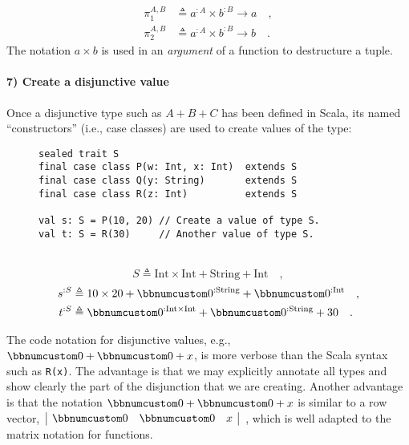 ~\vspace{-1\baselineskip}
\begin{align*}
\pi_{1}^{A,B} & \triangleq a^{:A}\times b^{:B}\rightarrow a\quad,\\
\pi_{2}^{A,B} & \triangleq a^{:A}\times b^{:B}\rightarrow b\quad.
\end{align*}
The notation $a\times b$ is used in an \emph{argument} of a function
to destructure a tuple.

\paragraph{7) Create a disjunctive value}

Once a disjunctive type such as $A+B+C$ has been defined in Scala,
its named \textsf{``}constructors\textsf{''} (i.e., case classes) are used to create
values of the type:

\begin{wrapfigure}{l}{0.5\columnwidth}%
\vspace{-0.75\baselineskip}
\begin{lstlisting}
sealed trait S
final case class P(w: Int, x: Int)  extends S
final case class Q(y: String)       extends S
final case class R(z: Int)          extends S

val s: S = P(10, 20) // Create a value of type S.
val t: S = R(30)     // Another value of type S.
\end{lstlisting}

\vspace{-0\baselineskip}
\end{wrapfigure}%

~\vspace{0.35\baselineskip}
\[
S\triangleq\text{Int}\times\text{Int}+\text{String}+\text{Int}\quad,
\]
\begin{align*}
s^{:S} & \triangleq10\times20+\bbnum 0^{:\text{String}}+\bbnum 0^{:\text{Int}}\quad,\\
t^{:S} & \triangleq\bbnum 0^{:\text{Int}\times\text{Int}}+\bbnum 0^{:\text{String}}+30\quad.
\end{align*}
\vspace{-0.9\baselineskip}

The code notation for disjunctive values, e.g., $\bbnum 0+\bbnum 0+x$,
is more verbose than the Scala syntax such as \lstinline!R(x)!. The
advantage is that we may explicitly annotate all types and show clearly
the part of the disjunction that we are creating. Another advantage
is that the notation $\bbnum 0+\bbnum 0+x$ is similar to a row vector,
$\,\begin{array}{|ccc|}
\bbnum 0 & \bbnum 0 & x\end{array}$~, which is well adapted to the matrix notation for functions.

